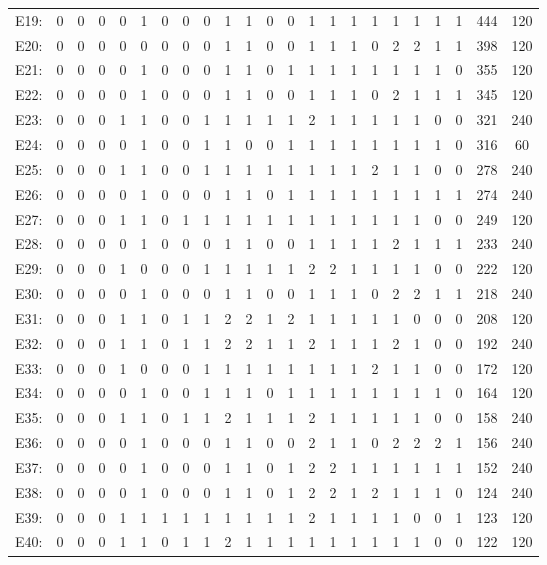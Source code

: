 \documentclass[12pt]{article}
\begin{document}
\begin{center}
\begin{tabular}{ccccccccccccccccccccc|c|c}
E19:&0&0&0&0&1&0&0&0&1&1&0&0&1&1&1&1&1&1&1&1&444&120\\
E20:&0&0&0&0&0&0&0&0&1&1&0&0&1&1&1&0&2&2&1&1&398&120\\
E21:&0&0&0&0&1&0&0&0&1&1&0&1&1&1&1&1&1&1&1&0&355&120\\
E22:&0&0&0&0&1&0&0&0&1&1&0&0&1&1&1&0&2&1&1&1&345&120\\
E23:&0&0&0&1&1&0&0&1&1&1&1&1&2&1&1&1&1&1&0&0&321&240\\
E24:&0&0&0&0&1&0&0&1&1&0&0&1&1&1&1&1&1&1&1&0&316&60\\
E25:&0&0&0&1&1&0&0&1&1&1&1&1&1&1&1&2&1&1&0&0&278&240\\
E26:&0&0&0&0&1&0&0&0&1&1&0&1&1&1&1&1&1&1&1&1&274&240\\
E27:&0&0&0&1&1&0&1&1&1&1&1&1&1&1&1&1&1&1&0&0&249&120\\
E28:&0&0&0&0&1&0&0&0&1&1&0&0&1&1&1&1&2&1&1&1&233&240\\
E29:&0&0&0&1&0&0&0&1&1&1&1&1&2&2&1&1&1&1&0&0&222&120\\
E30:&0&0&0&0&1&0&0&0&1&1&0&0&1&1&1&0&2&2&1&1&218&240\\
E31:&0&0&0&1&1&0&1&1&2&2&1&2&1&1&1&1&1&0&0&0&208&120\\
E32:&0&0&0&1&1&0&1&1&2&2&1&1&2&1&1&1&2&1&0&0&192&240\\
E33:&0&0&0&1&0&0&0&1&1&1&1&1&1&1&1&2&1&1&0&0&172&120\\
E34:&0&0&0&0&1&0&0&1&1&1&0&1&1&1&1&1&1&1&1&0&164&120\\
E35:&0&0&0&1&1&0&1&1&2&1&1&1&2&1&1&1&1&1&0&0&158&240\\
E36:&0&0&0&0&1&0&0&0&1&1&0&0&2&1&1&0&2&2&2&1&156&240\\
E37:&0&0&0&0&1&0&0&0&1&1&0&1&2&2&1&1&1&1&1&1&152&240\\
E38:&0&0&0&0&1&0&0&0&1&1&0&1&2&2&1&2&1&1&1&0&124&240\\
E39:&0&0&0&1&1&1&1&1&1&1&1&1&2&1&1&1&1&0&0&1&123&120\\
E40:&0&0&0&1&1&0&1&1&2&1&1&1&1&1&1&1&1&1&0&0&122&120\\
\end{tabular}
\end{center}
\end{document}
